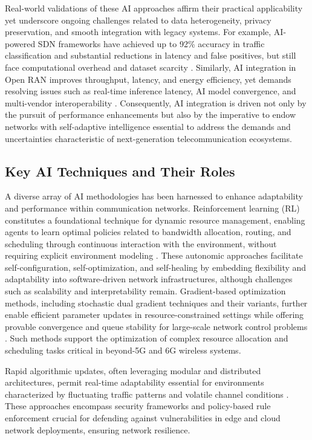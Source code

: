 \documentclass[sigconf]{acmart}
\begin{document}
Real-world validations of these AI approaches affirm their practical applicability yet underscore ongoing challenges related to data heterogeneity, privacy preservation, and smooth integration with legacy systems. For example, AI-powered SDN frameworks have achieved up to 92\% accuracy in traffic classification and substantial reductions in latency and false positives, but still face computational overhead and dataset scarcity \cite{ref52}. Similarly, AI integration in Open RAN improves throughput, latency, and energy efficiency, yet demands resolving issues such as real-time inference latency, AI model convergence, and multi-vendor interoperability \cite{ref54,ref55}. Consequently, AI integration is driven not only by the pursuit of performance enhancements but also by the imperative to endow networks with self-adaptive intelligence essential to address the demands and uncertainties characteristic of next-generation telecommunication ecosystems.

\subsection{Key AI Techniques and Their Roles}

A diverse array of AI methodologies has been harnessed to enhance adaptability and performance within communication networks. Reinforcement learning (RL) constitutes a foundational technique for dynamic resource management, enabling agents to learn optimal policies related to bandwidth allocation, routing, and scheduling through continuous interaction with the environment, without requiring explicit environment modeling \cite{ref11,ref12}. These autonomic approaches facilitate self-configuration, self-optimization, and self-healing by embedding flexibility and adaptability into software-driven network infrastructures, although challenges such as scalability and interpretability remain. Gradient-based optimization methods, including stochastic dual gradient techniques and their variants, further enable efficient parameter updates in resource-constrained settings while offering provable convergence and queue stability for large-scale network control problems \cite{ref13,ref14}. Such methods support the optimization of complex resource allocation and scheduling tasks critical in beyond-5G and 6G wireless systems. 

Rapid algorithmic updates, often leveraging modular and distributed architectures, permit real-time adaptability essential for environments characterized by fluctuating traffic patterns and volatile channel conditions \cite{ref15}. These approaches encompass security frameworks and policy-based rule enforcement crucial for defending against vulnerabilities in edge and cloud network deployments, ensuring network resilience.
\end{document}
